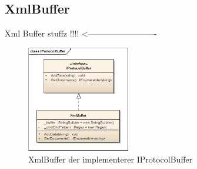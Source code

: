 \subsection{XmlBuffer}
Xml Buffer stuffz !!!! <-------------------------

\begin{figure}[H]
	\centering
	\includegraphics[width=0.4\textwidth]{Systemdesign/SharedLib/Images/Klasser/IProtocolBuffer.png}
	\caption{XmlBuffer der implementerer IProtocolBuffer}
	\label{fig:klasseXmlBuf}
\end{figure}
